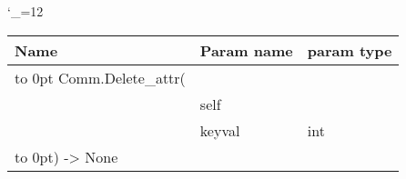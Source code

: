 \begingroup \catcode`\_=12 \tt
\begin{tabular}{lll}
\toprule
\textrm{Name}&\textrm{Param name}&\textrm{param type}\\
\midrule
\hbox to 0pt {Comm.Delete_attr(\hss}\\
& self\\
& keyval & int\\
\hbox to 0pt{) -> None\hss}\\
\bottomrule
\end{tabular}
\endgroup
